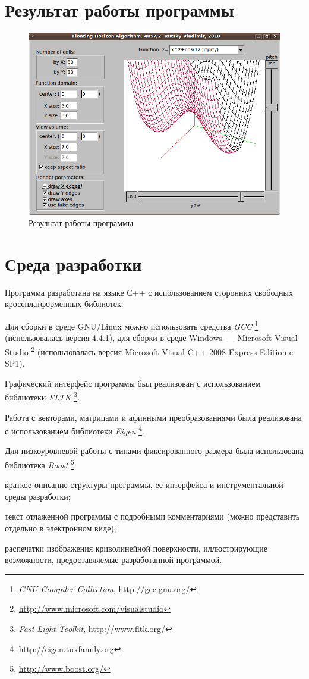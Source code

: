 \documentclass[a4paper,10pt]{article}
\begin{document}
\section{Результат работы программы}
\begin{figure}[h!]
  \centering
  \includegraphics[width=0.8\linewidth]{./screenshots/result1.png}
  \caption{Результат работы программы}
  \label{fig:result1}
\end{figure}


\section{Среда разработки}
Программа разработана на языке С++ с использованием сторонних свободных кроссплатформенных библиотек.

Для сборки в среде GNU/Linux можно использовать средства \textit{GCC}%
\footnote{\textit{GNU Compiler Collection}, \url{http://gcc.gnu.org/}} 
(использовалась версия 4.4.1),
для сборки в среде Windows~--- Microsoft Visual Studio%
\footnote{\url{http://www.microsoft.com/visualstudio}}
(использовалась версия Microsoft Visual C++ 2008 Express Edition c SP1).

Графический интерфейс программы был реализован с использованием библиотеки \textit{FLTK}%
\footnote{\textit{Fast Light Toolkit}, \url{http://www.fltk.org/}}.

Работа с векторами, матрицами и афинными преобразованиями была реализована с использованием библиотеки \textit{Eigen}%
\footnote{\url{http://eigen.tuxfamily.org}}.

Для низкоуровневой работы с типами фиксированного размера была использована библиотека \textit{Boost}%
\footnote{\url{http://www.boost.org/}}.

краткое описание структуры программы, ее интерфейса и инструментальной среды разработки;

текст отлаженной программы с подробными комментариями (можно представить отдельно в электронном виде);

распечатки изображения криволинейной поверхности, иллюстрирующие возможности, предоставляемые разработанной программой. 



\end{document}
